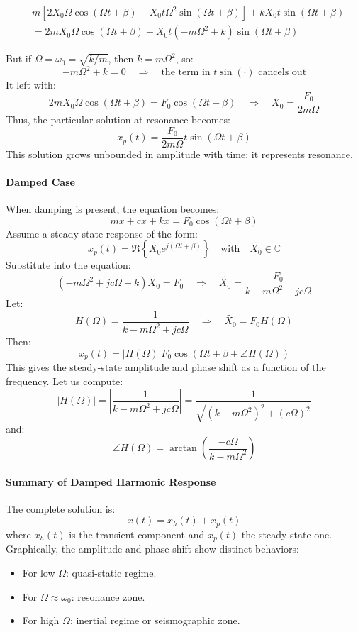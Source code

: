 \begin{align*}
&m \left[ 2 X_0 \Omega \cos(\Omega t + \beta) - X_0 t \Omega^2 \sin(\Omega t + \beta) \right]
+ k X_0 t \sin(\Omega t + \beta) \\
&= 2 m X_0 \Omega \cos(\Omega t + \beta)
+ X_0 t \left( - m \Omega^2 + k \right) \sin(\Omega t + \beta)
\end{align*}

But if \( \Omega = \omega_0 = \sqrt{k/m} \), then \( k = m \Omega^2 \), so:
\[
- m \Omega^2 + k = 0
\quad \Rightarrow \quad
\text{the term in } t \sin(\cdot) \text{ cancels out}
\]
It left with:
\[
2 m X_0 \Omega \cos(\Omega t + \beta) = F_0 \cos(\Omega t + \beta)
\quad \Rightarrow \quad
X_0 = \frac{F_0}{2 m \Omega}
\]
Thus, the particular solution at resonance becomes:
\[
x_p(t) = \frac{F_0}{2 m \Omega} t \sin(\Omega t + \beta)
\]
This solution grows unbounded in amplitude with time: it represents resonance.

\paragraph{Damped Case} When damping is present, the equation becomes:
\[
m \ddot{x} + c \dot{x} + k x = F_0 \cos(\Omega t + \beta)
\]
Assume a steady-state response of the form:
\[
x_p(t) = \Re\left\{ \tilde{X_0} e^{j(\Omega t + \beta)} \right\}
\quad \text{with} \quad \tilde{X_0} \in \mathbb{C}
\]
Substitute into the equation:
\[
(-m \Omega^2 + j c \Omega + k) \tilde{X_0} = F_0
\quad \Rightarrow \quad
\tilde{X_0} = \frac{F_0}{k - m \Omega^2 + j c \Omega}
\]
Let:
\[
H(\Omega) = \frac{1}{k - m \Omega^2 + j c \Omega}
\quad \Rightarrow \quad
\tilde{X_0} = F_0 H(\Omega)
\]
Then:
\[
x_p(t) = |H(\Omega)| F_0 \cos(\Omega t + \beta + \angle H(\Omega))
\]
This gives the steady-state amplitude and phase shift as a function of the frequency. Let us compute:
\[
|H(\Omega)| = \left| \frac{1}{k - m \Omega^2 + j c \Omega} \right|
= \frac{1}{\sqrt{(k - m \Omega^2)^2 + (c \Omega)^2}}
\]
and:
\[
\angle H(\Omega) = \arctan\left( \frac{-c \Omega}{k - m \Omega^2} \right)
\]

\paragraph{Summary of Damped Harmonic Response} The complete solution is:
\[
x(t) = x_h(t) + x_p(t)
\]
where \( x_h(t) \) is the transient component and \( x_p(t) \) the steady-state one. Graphically, the amplitude and phase shift show distinct behaviors:
\begin{itemize}
  \item For low \( \Omega \): quasi-static regime.
  \item For \( \Omega \approx \omega_0 \): resonance zone.
  \item For high \( \Omega \): inertial regime or seismographic zone.
\end{itemize}

